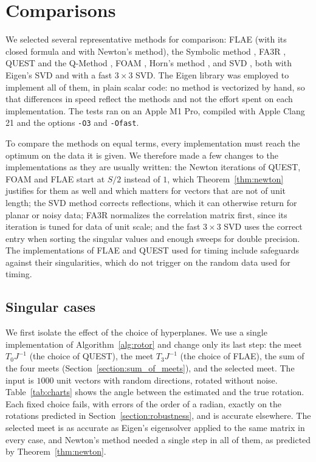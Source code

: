 \documentclass{birkjour}
\theoremstyle{definition}
\theoremstyle{remark}
\numberwithin{equation}{section}
\begin{document}
\section{Comparisons}
\label{section:comparisons}

We selected several representative methods for comparison: FLAE \cite{Wu2017} (with its closed formula and with Newton's method), the Symbolic method \cite{Wu2018FS3R}, FA3R \cite{Wu2018FA3R}, QUEST and the Q-Method \cite{Shuster1981}, FOAM \cite{Markley1993}, Horn's method \cite{Horn1987}, and SVD \cite{Arun1987}, both with Eigen's SVD and with a fast $3 \times 3$ SVD. The Eigen library \cite{Eigen} was employed to implement all of them, in plain scalar code: no method is vectorized by hand, so that differences in speed reflect the methods and not the effort spent on each implementation. The tests ran on an Apple M1 Pro, compiled with Apple Clang 21 and the options \texttt{-O3} and \texttt{-Ofast}.

To compare the methods on equal terms, every implementation must reach the optimum on the data it is given. We therefore made a few changes to the implementations as they are usually written: the Newton iterations of QUEST, FOAM and FLAE start at $S/2$ instead of $1$, which Theorem~\ref{thm:newton} justifies for them as well and which matters for vectors that are not of unit length; the SVD method corrects reflections, which it can otherwise return for planar or noisy data; FA3R normalizes the correlation matrix first, since its iteration is tuned for data of unit scale; and the fast $3 \times 3$ SVD uses the correct entry when sorting the singular values and enough sweeps for double precision. The implementations of FLAE and QUEST used for timing include safeguards against their singularities, which do not trigger on the random data used for timing.

\subsection{Singular cases}

We first isolate the effect of the choice of hyperplanes. We use a single implementation of Algorithm~\ref{alg:rotor} and change only its last step: the meet $T_0 J^{-1}$ (the choice of QUEST), the meet $T_3 J^{-1}$ (the choice of FLAE), the sum of the four meets (Section~\ref{section:sum_of_meets}), and the selected meet. The input is $1000$ unit vectors with random directions, rotated without noise. Table~\ref{tab:charts} shows the angle between the estimated and the true rotation. Each fixed choice fails, with errors of the order of a radian, exactly on the rotations predicted in Section~\ref{section:robustness}, and is accurate elsewhere. The selected meet is as accurate as Eigen's eigensolver applied to the same matrix in every case, and Newton's method needed a single step in all of them, as predicted by Theorem~\ref{thm:newton}.
\end{document}

